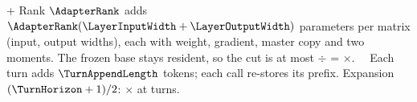 \documentclass{studysheet}
\begin{document}
\begin{leftcol}
\vspace{12pt}
%
  { \approx {}\times{} + \times{}}%
  {Rank $\AdapterRank$ adds $\AdapterRank(\LayerInputWidth+\LayerOutputWidth)$ parameters per matrix (input, output widths), each
   with weight, gradient, master copy and two moments.}%
  {The frozen base stays resident, so the cut is at most  $\div$  = $\times$.}{}
%
  { \approx \TurnAppendLength\,
   \quad{}\quad \TurnHorizon\,\TurnAppendLength}%
  {Each turn adds $\TurnAppendLength$ tokens; each call re-stores its prefix. Expansion
   $(\TurnHorizon+1)/2$: $\times$ at  turns.}%
  {}{}
\end{leftcol}%
\end{document}
